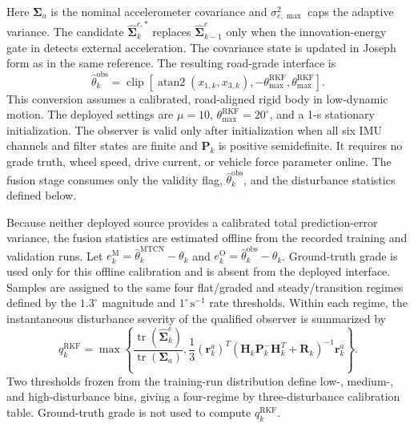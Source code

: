 \documentclass{ieeeaccess}
\newcommand{\citep}[1]{\cite{#1}}
\begin{document}
Here $\bm\Sigma_a$ is the nominal accelerometer covariance and $\sigma_{e,\max}^{2}$ caps the adaptive variance. The candidate $\hat{\bm\Sigma}_{k}^{e,*}$ replaces $\hat{\bm\Sigma}_{k-1}^{e}$ only when the innovation-energy gate in \citep{Chen2024RobustAttitude} detects external acceleration. The covariance state is updated in Joseph form as in the same reference. The resulting road-grade interface is
\begin{equation}
\hat\theta_k^{\mathrm{obs}}
=\operatorname{clip}\!\left[
\operatorname{atan2}(x_{1,k},x_{3,k}),
-\theta_{\max}^{\mathrm{RKF}},\theta_{\max}^{\mathrm{RKF}}
\right].
\label{eq:rkf_imu_grade_output}
\end{equation}
This conversion assumes a calibrated, road-aligned rigid body in low-dynamic motion. The deployed settings are $\mu=10$, $\theta_{\max}^{\mathrm{RKF}}=20^{\circ}$, and a 1-s stationary initialization. The observer is valid only after initialization when all six IMU channels and filter states are finite and $\bm P_k$ is positive semidefinite. It requires no grade truth, wheel speed, drive current, or vehicle force parameter online. The fusion stage consumes only the validity flag, $\hat\theta_k^{\mathrm{obs}}$, and the disturbance statistics defined below.

Because neither deployed source provides a calibrated total prediction-error variance, the fusion statistics are estimated offline from the recorded training and validation runs. Let $e_k^{\mathrm{M}}=\hat\theta_k^{\mathrm{MTCN}}-\theta_k$ and $e_k^{\mathrm{O}}=\hat\theta_k^{\mathrm{obs}}-\theta_k$. Ground-truth grade is used only for this offline calibration and is absent from the deployed interface. Samples are assigned to the same four flat/graded and steady/transition regimes defined by the $1.3^{\circ}$ magnitude and $1^{\circ}\,\mathrm{s}^{-1}$ rate thresholds. Within each regime, the instantaneous disturbance severity of the qualified observer is summarized by
\begin{equation}
q_k^{\mathrm{RKF}}=
\max\!\left\{
\frac{\operatorname{tr}(\hat{\bm\Sigma}_{k}^{e})}
{\operatorname{tr}(\bm\Sigma_a)},
\frac{1}{3}(\bm r_k^{a})^{T}
\left(\bm H_k\bm P_k^{-}\bm H_k^{T}+\bm R_k\right)^{-1}
\bm r_k^{a}
\right\}.
\label{eq:fusion_rkf_disturbance_score}
\end{equation}
Two thresholds frozen from the training-run distribution define low-, medium-, and high-disturbance bins, giving a four-regime by three-disturbance calibration table. Ground-truth grade is not used to compute $q_k^{\mathrm{RKF}}$.
\end{document}
